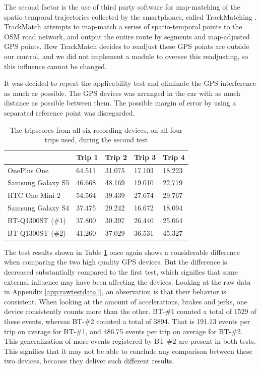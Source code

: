 The second factor is the use of third party software for map-matching of the spatio-temporal trajectories collected by the smartphones, called TrackMatching \citep{trackmatch}. TrackMatch attempts to map-match a series of spatio-temporal points to the OSM road network, and output the entire route by segments and map-adjusted GPS points. How TrackMatch decides to readjust these GPS points are outside our control, and we did not implement a module to oversee this readjusting, so this influence cannot be changed. 

It was decided to repeat the applicability test and eliminate the GPS interference as much as possible. The GPS devices was arranged in the car with as much distance as possible between them. The possible margin of error by using a separated reference point was disregarded. 

\begin{table}[tb]
\centering
\caption{The tripscores from all six recording devices, on all four trips used, during the second test}
\label{tab:smartphone_test_two}
\begin{tabular}{|l|llll|}
\hline
\rowcolor{tablegreen}

                   & \textbf{Trip 1}    & \textbf{Trip 2}    & \textbf{Trip 3}    & \textbf{Trip 4}  \\\hline
OnePlus One        & 64.511  & 31.075  & 17.103  & 18.223 \\
Samsung Galaxy S5  & 46.668  & 48.169  & 19.010  & 22.779 \\
HTC One Mini 2     & 54.564  & 39.439  & 27.674  & 29.767 \\
Samsung Galaxy S4  & 37.475  & 29.242  & 16.672  & 18.094 \\
BT-Q1300ST (\#1)   & 37.800  & 30.397  & 26.440  & 25.064 \\
BT-Q1300ST (\#2)   & 41.260  & 37.029  & 36.531  & 45.327 \\\hline

\end{tabular}
\end{table}

The test results shown in Table \ref{tab:smartphone_test_two} once again shows a considerable difference when comparing the two high quality GPS devices. But the difference is decreased substantially compared to the first test, which signifies that some external influence may have been affecting the devices. Looking at the raw data in Appendix \ref{app:rawtestdata1}, an observation is that their behavior is consistent. When looking at the amount of accelerations, brakes and jerks, one device consistently counts more than the other. BT-\#1 counted a total of 1529 of these events, whereas BT-\#2 counted a total of 3894. That is 191.13 events per trip on average for BT-\#1, and 486.75 events per trip on average for BT-\#2. This generalization of more events registered by BT-\#2 are present in both tests. This signifies that it may not be able to conclude any comparison between these two devices, because they deliver such different results.

